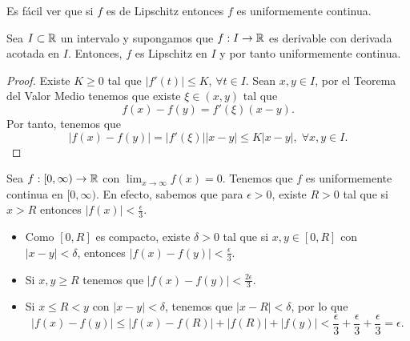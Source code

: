 \begin{observation}
Es fácil ver que si $\displaystyle f $ es de Lipschitz entonces $\displaystyle f $ es uniformemente continua. 
\end{observation}
\begin{prop}
Sea $\displaystyle I \subset \mathbb{R} $ un intervalo y supongamos que $\displaystyle f : I \to \mathbb{R} $ es derivable con derivada acotada en $\displaystyle I $. Entonces, $\displaystyle f $ es Lipschitz en $\displaystyle I $ y por tanto uniformemente continua.
\end{prop}
\begin{proof}
Existe $\displaystyle K \geq 0 $ tal que $\displaystyle \left|f'\left(t\right)\right|\leq K $, $\displaystyle \forall t \in I $. Sean $\displaystyle x,y \in I $, por el Teorema del Valor Medio tenemos que existe $\displaystyle \xi \in \left(x,y\right) $ tal que 
\[f\left(x\right)-f\left(y\right) = f'\left(\xi\right)\left(x-y\right) .\]
Por tanto, tenemos que 
\[ \left|f\left(x\right)-f\left(y\right)\right| = \left|f'\left(\xi \right)\right| \left|x - y\right|\leq K \left|x-y\right|, \; \forall x,y \in I .\]
\end{proof}
\begin{eg}
Sea $\displaystyle f : [0,\infty) \to \mathbb{R} $ con $\displaystyle \lim_{x \to \infty}f\left(x\right) = 0 $. Tenemos que $\displaystyle f $ es uniformemente continua en $\displaystyle [0,\infty) $. En efecto, sabemos que para $\displaystyle \epsilon > 0 $, existe $\displaystyle R > 0 $ tal que si $\displaystyle x > R $ entonces $\displaystyle \left|f\left(x\right)\right| < \frac{\epsilon }{3} $.
\begin{itemize}
\item Como $\displaystyle [0,R] $ es compacto, existe $\displaystyle \delta > 0 $ tal que si $\displaystyle x,y \in [0,R] $ con $\displaystyle \left|x-y\right| < \delta  $, entonces $\displaystyle \left|f\left(x\right)-f\left(y\right)\right| < \frac{\epsilon }{3} $.
\item Si $\displaystyle x,y \geq R $ tenemos que $\displaystyle \left|f\left(x\right)-f\left(y\right)\right| < \frac{2\epsilon }{3} $. 
\item Si $\displaystyle x \leq R < y$ con $\displaystyle \left|x-y\right| < \delta  $, tenemos que $\displaystyle \left|x - R\right| < \delta  $, por lo que 
\[ \left|f\left(x\right)-f\left(y\right)\right| \leq \left|f\left(x\right) -f\left(R\right)\right| + \left|f\left(R\right)\right| + \left|f\left(y\right)\right| < \frac{\epsilon }{3} + \frac{\epsilon }{3} + \frac{\epsilon }{3} = \epsilon .\]
\end{itemize}
\end{eg}
